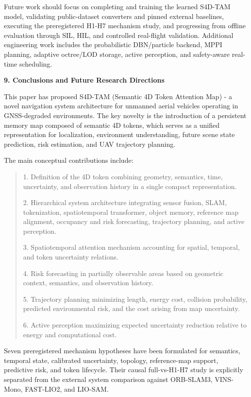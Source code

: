 \documentclass[
]{article}
\begin{document}
Future work should focus on completing and training the learned S4D-TAM
model, validating public-dataset converters and pinned external
baselines, executing the preregistered H1-H7 mechanism study, and
progressing from offline evaluation through SIL, HIL, and controlled
real-flight validation. Additional engineering work includes the
probabilistic DBN/particle backend, MPPI planning, adaptive octree/LOD
storage, active perception, and safety-aware real-time scheduling.

\textbf{9. Conclusions and Future Research Directions}

This paper has proposed S4D-TAM (Semantic 4D Token Attention Map) - a
novel navigation system architecture for unmanned aerial vehicles
operating in GNSS-degraded environments. The key novelty is the
introduction of a persistent memory map composed of semantic 4D tokens,
which serves as a unified representation for localization, environment
understanding, future scene state prediction, risk estimation, and UAV
trajectory planning.

The main conceptual contributions include:

\begin{quote}
1. Definition of the 4D token combining geometry, semantics, time,
uncertainty, and observation history in a single compact representation.

2. Hierarchical system architecture integrating sensor fusion, SLAM,
tokenization, spatiotemporal transformer, object memory, reference map
alignment, occupancy and risk forecasting, trajectory planning, and
active perception.

3. Spatiotemporal attention mechanism accounting for spatial, temporal,
and token uncertainty relations.

4. Risk forecasting in partially observable areas based on geometric
context, semantics, and observation history.

5. Trajectory planning minimizing length, energy cost, collision
probability, predicted environmental risk, and the cost arising from map
uncertainty.

6. Active perception maximizing expected uncertainty reduction relative
to energy and computational cost.
\end{quote}

Seven preregistered mechanism hypotheses have been formulated for
semantics, temporal state, calibrated uncertainty, topology,
reference-map support, predictive risk, and token lifecycle. Their
causal full-vs-H1-H7 study is explicitly separated from the external
system comparison against ORB-SLAM3, VINS-Mono, FAST-LIO2, and LIO-SAM.
\end{document}
